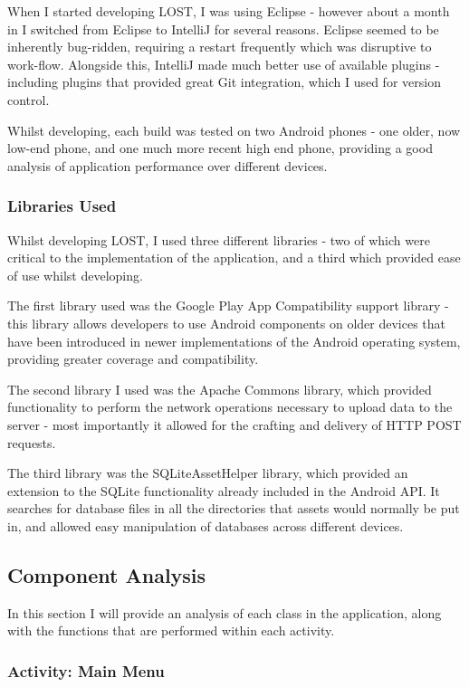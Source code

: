 \documentclass[11pt]{informatics-report}
\begin{document}
When I started developing LOST, I was using Eclipse - however about a month in I switched from Eclipse to IntelliJ for several reasons. Eclipse seemed to be inherently bug-ridden, requiring a restart frequently which was disruptive to work-flow. Alongside this, IntelliJ made much better use of available plugins - including plugins that provided great Git integration, which I used for version control. 

Whilst developing, each build was tested on two Android phones - one older, now low-end phone, and one much more recent high end phone, providing a good analysis of application performance over different devices.

\subsubsection{Libraries Used}

Whilst developing LOST, I used three different libraries - two of which were critical to the implementation of the application, and a third which provided ease of use whilst developing. 

The first library used was the Google Play App Compatibility support library\cite{appcompat} - this library allows developers to use Android components on older devices that have been introduced in newer implementations of the Android operating system, providing greater coverage and compatibility. 

The second library I used was the Apache Commons library, which provided functionality to perform the network operations necessary to upload data to the server - most importantly it allowed for the crafting and delivery of HTTP POST requests.

The third library was the SQLiteAssetHelper library, which provided an extension to the SQLite functionality already included in the Android API. It searches for database files in all the directories that assets would normally be put in, and allowed easy manipulation of databases across different devices.

\subsection{Component Analysis}

In this section I will provide an analysis of each class in the application, along with the functions that are performed within each activity.

\subsubsection{Activity: Main Menu}
\end{document}
